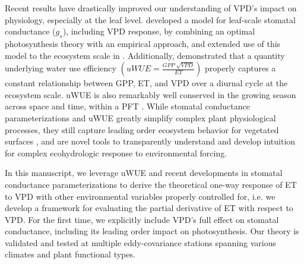 Recent results have drastically improved our understanding of VPD's
impact on physiology, especially at the leaf
level. \citet{MEDLYN_2011} developed a model for leaf-scale stomatal
conductance ($g_s$), including VPD response, by combining an optimal
photosynthesis theory \citep{Cowan_1977} with an empirical approach,
and extended use of this model to the ecosystem scale in
\citet{Medlyn_2017}. Additionally, \citet{Zhou_2014} demonstrated that
a quantity underlying water use efficiency
$\left(uWUE = \frac{GPP\; \sqrt{VPD}}{ET}\right)$ properly captures a
constant relationship between GPP, ET, and VPD over a diurnal cycle at
the ecosystem scale. uWUE is also remarkably well conserved in the
growing season across space and time, within a PFT
\citep{Zhou_2015}. While stomatal conductance parameterizations and
uWUE greatly simplify complex plant physiological processes, they
still capture leading order ecosystem behavior for vegetated
surfaces \citep{Medlyn_2017, Zhou_2014}, and are novel tools to
transparently understand and develop intuition for complex
ecohydrologic response to environmental forcing.

In this manuscript,
we leverage uWUE and recent developments in stomatal conductance
parameterizations \citep{MEDLYN_2011} to derive the theoretical
one-way response of ET to VPD with other environmental variables
properly controlled for, i.e. we develop a framework for evaluating
the partial derivative of ET with respect to VPD. For the first time,
we explicitly include VPD's full effect on stomatal conductance,
including its leading order impact on photosynthesis. Our theory is
validated and tested at multiple eddy-covariance stations spanning
various climates and plant functional types.
